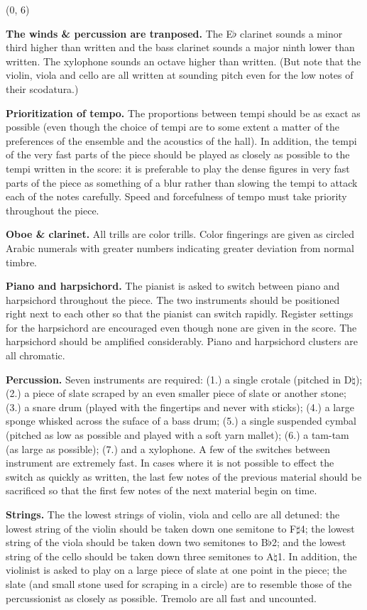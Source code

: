 \documentclass[10pt]{article}
\begin{document}
\begin{textblock}{23}(0, 6)

\textbf{The winds \& percussion are tranposed.} The E$\flat$ clarinet sounds a
minor third higher than written and the bass clarinet sounds a major ninth
lower than written. The xylophone sounds an octave higher than written. (But
note that the violin, viola and cello are all written at sounding pitch even
for the low notes of their scodatura.)

\textbf{Prioritization of tempo.} The proportions between tempi should be as
exact as possible (even though the choice of tempi are to some extent a matter
of the preferences of the ensemble and the acoustics of the hall). In addition,
the tempi of the very fast parts of the piece should be played as closely as
possible to the tempi written in the score: it is preferable to play the dense
figures in very fast parts of the piece as something of a blur rather than
slowing the tempi to attack each of the notes carefully. Speed and forcefulness
of tempo must take priority throughout the piece.

\textbf{Oboe \& clarinet.} All trills are color trills. Color fingerings are
given as circled Arabic numerals with greater numbers indicating greater
deviation from normal timbre.

\textbf{Piano and harpsichord.} The pianist is asked to switch between piano
and harpsichord throughout the piece. The two instruments should be positioned
right next to each other so that the pianist can switch rapidly. Register
settings for the harpsichord are encouraged even though none are given in the
score. The harpsichord should be amplified considerably. Piano and harpsichord
clusters are all chromatic.

\textbf{Percussion.} Seven instruments are required: (1.) a single crotale
(pitched in D$\natural$); (2.) a piece of slate scraped by an even smaller
piece of slate or another stone; (3.) a snare drum (played with the fingertips
and never with sticks); (4.) a large sponge whisked across the suface of a bass
drum; (5.) a single suspended cymbal (pitched as low as possible and played
with a soft yarn mallet); (6.) a tam-tam (as large as possible); (7.) and a
xylophone. A few of the switches between instrument are extremely fast. In
cases where it is not possible to effect the switch as quickly as written, the
last few notes of the previous material should be sacrificed so that the first
few notes of the next material begin on time.

\textbf{Strings.} The the lowest strings of violin, viola and cello are all
detuned: the lowest string of the violin should be taken down one semitone to
F$\sharp$4; the lowest string of the viola should be taken down two semitones
to B$\flat$2; and the lowest string of the cello should be taken down three
semitones to A$\natural$1. In addition, the violinist is asked to play on a
large piece of slate at one point in the piece; the slate (and small stone used
for scraping in a circle) are to resemble those of the percussionist as closely
as possible. Tremolo are all fast and uncounted.

\end{textblock}
\end{document}
